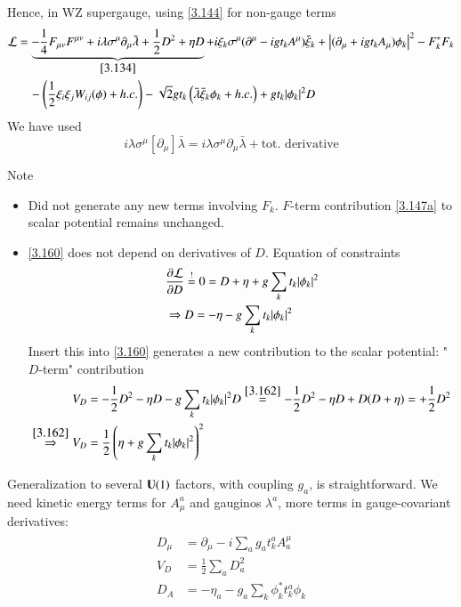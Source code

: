 Hence, in WZ supergauge, using \eqref{3.144} for non-gauge terms
\begin{align}
   \mathcal{L} &= \underbrace{-\frac{1}{4} F_{\mu\nu} F^{\mu\nu} + i\lambda \sigma^\mu \partial_\mu \bar\lambda + \frac{1}{2} D^2 + \eta D}_{\eqref{3.134}} + i\xi_k \sigma^\mu (\partial^\mu - igt_k A^\mu) \bar\xi_k + \left| (\partial_\mu + igt_k A_\mu)\phi_k \right|^2 - F^*_k F_k \notag \\
   &\quad- \left( \frac{1}{2} \xi_i \xi_j W_{ij}(\phi) + h.c. \right) - \sqrt{2} g t_k \left( \bar\lambda \bar\xi_k \phi_k + h.c. \right) + gt_k |\phi_k|^2 D \label{3.160}
\end{align}
We have used
\begin{equation}
   i\lambda \sigma^\mu [\partial_\mu] \bar\lambda = i\lambda \sigma^\mu \partial_\mu \bar\lambda + \text{tot. derivative} \label{3.161}
\end{equation}


Note
\begin{itemize}
   \item Did not generate any new terms involving $F_k$. $F$-term contribution \eqref{3.147a} to scalar potential remains unchanged.
   \item \eqref{3.160} does not depend on derivatives of $D$. Equation of constraints
      \begin{align}
         &\pdv{\mathcal{L}}{D} \stackrel{!}{=} 0 = D + \eta + g \sum_k t_k |\phi_k|^2 \notag \\ 
         &\Rightarrow D = -\eta -g \sum_k t_k |\phi_k|^2 \label{3.162}
      \end{align}
      Insert this into \eqref{3.160} generates a new contribution to the scalar potential: "$D$-term" contribution
      \begin{align}
         V_D &= -\frac{1}{2} D^2 - \eta D -g \sum_k t_k |\phi_k|^2 D \stackrel{\eqref{3.162}}{=} -\frac{1}{2} D^2 - \eta D + D(D + \eta) = + \frac{1}{2} D^2 \notag \\
         \stackrel{\eqref{3.162}}{\Rightarrow} V_D &= \frac{1}{2} \left( \eta + g \sum_k t_k |\phi_k|^2 \right)^2 \label{3.163}
      \end{align}
\end{itemize}

   Generalization to several $\mathbf{U}(1)$ factors, with coupling $g_a$, is straightforward. We need kinetic energy terms for $A_\mu^a$ and gauginos $\lambda^a$, more terms in gauge-covariant derivatives: 
   \begin{align}
      \begin{split}
         D_\mu &= \partial_\mu - i \sum_a g_a t^a_k A^\mu_a \\
         V_D &= \frac{1}{2} \sum_a D^2_a \\
         D_A &= - \eta_a - g_a \sum_k \phi_k^* t_k^a \phi_k
      \end{split}
      \label{3.164}
   \end{align}

